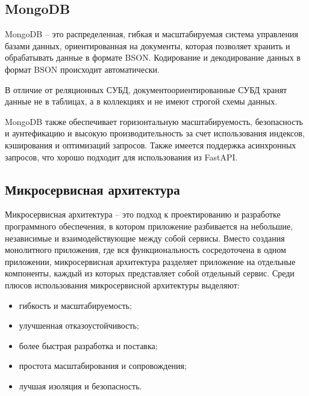 
\subsection{MongoDB}\label{subsec:domain:mongodb}
MongoDB\cite{mongodb_docs} -- это распределенная, гибкая и масштабируемая система управления базами данных,
ориентированная на документы, которая позволяет хранить и обрабатывать данные в формате BSON.
Кодирование и декодирование данных в формат BSON происходит автоматически.

В отличие от реляционных СУБД, документоориентированные СУБД хранят данные не в таблицах, а в коллекциях и не имеют строгой схемы данных.

MongoDB также обеспечивает горизонтальную масштабируемость, безопасность и аунтефикацию и
высокую производительность за счет использования индексов, кэширования и оптимизаций запросов.
Также имеется поддержка асинхронных запросов, что хорошо подходит для использования из FastAPI.



\subsection{Микросервисная архитектура}\label{subsec:domain:microservices-arch}
Микросервисная архитектура -- это подход к проектированию и разработке программного обеспечения, в котором приложение разбивается на небольшие, независимые и взаимодействующие между собой сервисы.
Вместо создания монолитного приложения, где вся функциональность сосредоточена в одном приложении, микросервисная архитектура разделяет приложение на отдельные компоненты, каждый из которых представляет собой отдельный сервис.
Среди плюсов использования микросервисной архитектуры выделяют:
\begin{itemize}
    \item гибкость и масштабируемость;
    \item улучшенная отказоустойчивость;
    \item более быстрая разработка и поставка;
    \item простота масштабирования и сопровождения;
    \item лучшая изоляция и безопасность.
\end{itemize}

